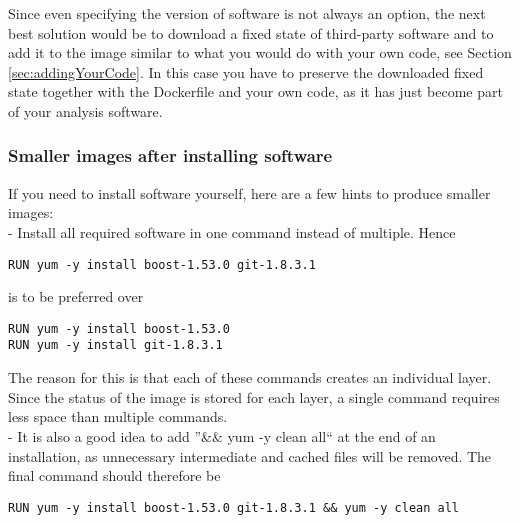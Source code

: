 \documentclass[a4paper, twoside, 11pt]{article}
\begin{document}
Since even specifying the version of software is not always an option, 
the next best solution would be to download a fixed state of third-party software 
and to add it to the image similar to what you would do with your own code, 
see Section \ref{sec:addingYourCode}. 
In this case you have to preserve the downloaded fixed state together with the Dockerfile and your own code, 
as it has just become part of your analysis software. 


\subsubsection{Smaller images after installing software}
If you need to install software yourself, here are a few hints to produce smaller images: \\
- Install all required software in one command instead of multiple. Hence 
\begin{lstlisting}[basicstyle=\ttfamily\small,upquote=true,columns=flexible,keepspaces=true,frame=single]
RUN yum -y install boost-1.53.0 git-1.8.3.1
\end{lstlisting}
is to be preferred over
\begin{lstlisting}[basicstyle=\ttfamily\small,upquote=true,columns=flexible,keepspaces=true,frame=single]
RUN yum -y install boost-1.53.0
RUN yum -y install git-1.8.3.1
\end{lstlisting}
The reason for this is that each of these commands creates an individual layer. 
Since the status of the image is stored for each layer, a single command requires less space than multiple commands. \\
- It is also a good idea to add ''\&\& yum -y clean all`` at the end of an installation, 
as unnecessary intermediate and cached files will be removed. 
The final command should therefore be
\begin{lstlisting}[basicstyle=\ttfamily\small,upquote=true,columns=flexible,keepspaces=true,frame=single]
RUN yum -y install boost-1.53.0 git-1.8.3.1 && yum -y clean all
\end{lstlisting}
\end{document}
